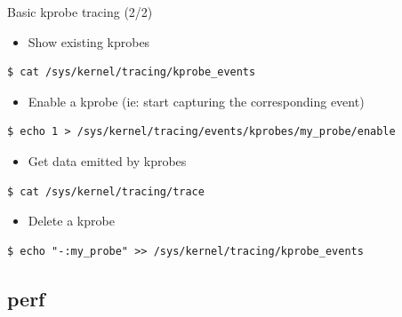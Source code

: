 \begin{frame}[fragile]{Basic kprobe tracing (2/2)}
	\begin{itemize}
		\item Show existing kprobes
	\end{itemize}
	\begin{block}{}
		\begin{verbatim}
$ cat /sys/kernel/tracing/kprobe_events
		\end{verbatim}
	\end{block}
	\begin{itemize}
		\item Enable a kprobe (ie: start capturing the
			corresponding event)
	\end{itemize}
	\begin{block}{}
		\begin{verbatim}
$ echo 1 > /sys/kernel/tracing/events/kprobes/my_probe/enable
		\end{verbatim}
	\end{block}
	\begin{itemize}
		\item Get data emitted by kprobes
	\end{itemize}
	\begin{block}{}
		\begin{verbatim}
$ cat /sys/kernel/tracing/trace
		\end{verbatim}
	\end{block}
	\begin{itemize}
		\item Delete a kprobe
	\end{itemize}
	\begin{block}{}
		\begin{verbatim}
$ echo "-:my_probe" >> /sys/kernel/tracing/kprobe_events
		\end{verbatim}
	\end{block}
\end{frame}

\subsection{perf}

